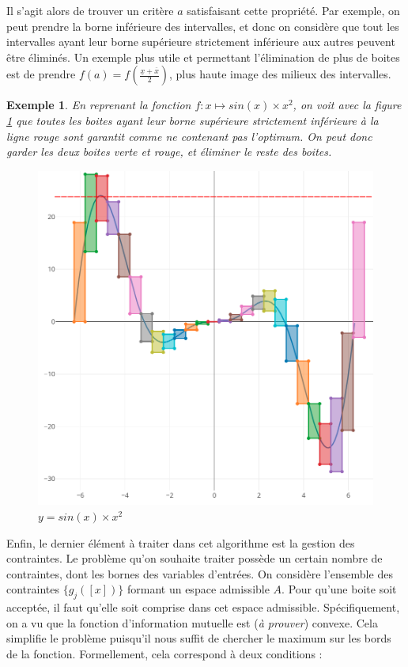 \documentclass[12pt,a4paper]{article}
\newtheorem{ex}{Exemple}
\begin{document}
    Il s'agit alors de trouver un critère $a$ satisfaisant cette propriété. Par exemple, on peut prendre la borne inférieure des intervalles, et donc on considère que tout les intervalles ayant leur borne supérieure strictement inférieure aux autres peuvent être éliminés. Un exemple plus utile et permettant l'élimination de plus de boites est de prendre $f(a) = f(\frac{\underline{x} + \overline{x}}{2})$, plus haute image des milieux des intervalles.

    \begin{ex}
        En reprenant la fonction $f : x \mapsto sin(x)\times x^2$, on voit avec la figure \ref{fig:sinx_sqrx_optim} que toutes les boites ayant leur borne supérieure strictement inférieure à la ligne rouge sont garantit comme ne contenant pas l'optimum. On peut donc garder les deux boites verte et rouge, et éliminer le reste des boites.

        \begin{figure}[h]
            \centering
            \includegraphics[scale=0.2]{sinx_sqrx_optim.png}
            \caption{$y = sin(x) \times x^2$}
            \label{fig:sinx_sqrx_optim}
        \end{figure}
    \end{ex}

    Enfin, le dernier élément à traiter dans cet algorithme est la gestion des contraintes. Le problème qu'on souhaite traiter possède un certain nombre de contraintes, dont les bornes des variables d'entrées. On considère l'ensemble des contraintes $\{g_j([x])\}$ formant un espace admissible $A$. Pour qu'une boite soit acceptée, il faut qu'elle soit comprise dans cet espace admissible. Spécifiquement, on a vu que la fonction d'information mutuelle est (\textit{à prouver}) convexe. Cela simplifie le problème puisqu'il nous suffit de chercher le maximum sur les bords de la fonction. Formellement, cela correspond à deux conditions :
\end{document}
